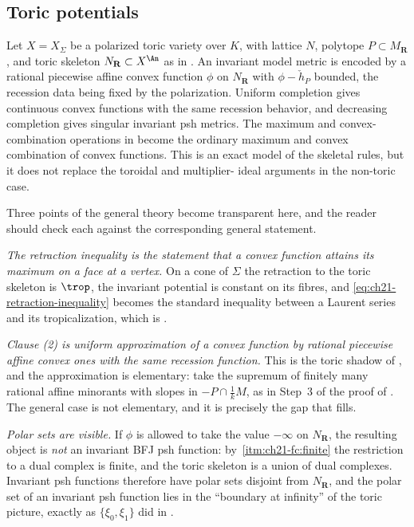 \subsection{Toric potentials}
\label{sec:ch21-worked-toric}

\begin{example}
\label{ex:ch21-toric}
Let \(X=X_\Sigma\) be a polarized toric variety over \(K\), with lattice
\(N\), polytope \(P\subset M_{\mathbf R}\), and toric skeleton
\(N_{\mathbf R}\subset X^{\An}\) as in .  An
invariant model metric is
encoded by a rational piecewise affine convex function \(\phi\) on
\(N_{\mathbf R}\) with \(\phi-\check h_P\) bounded, the recession data being
fixed by the polarization.  Uniform completion gives continuous convex
functions with the same recession behavior, and decreasing completion gives
singular invariant psh metrics.  The maximum and convex-combination
operations in  become the ordinary
maximum and convex combination of convex functions.  This is an exact model
of the skeletal rules, but it does not replace the toroidal and multiplier-%
ideal arguments in the non-toric case.

Three points of the general theory become transparent here, and the reader
should check each against the corresponding general statement.

\emph{The retraction inequality is the statement that a convex function
attains its maximum on a face at a vertex.}  On a cone of \(\Sigma\) the
retraction to the toric skeleton is \(\trop\), the invariant potential is
constant on its fibres, and \eqref{eq:ch21-retraction-inequality} becomes
the standard inequality between a Laurent series and its tropicalization,
which is .

\emph{Clause \textup{(2)} is uniform approximation of a convex function by
rational piecewise affine convex ones with the same recession function.}
This is the toric shadow of , and the approximation
is elementary: take the supremum of finitely many rational affine minorants
with slopes in \(-P\cap\tfrac1kM\), as in Step~3 of the proof of
.  The general case is not elementary, and it is
precisely the gap that  fills.

\emph{Polar sets are visible.}  If \(\phi\) is allowed to take the value
\(-\infty\) on \(N_{\mathbf R}\), the resulting object is \emph{not} an
invariant BFJ psh function: by
\,\cref{itm:ch21-fc:finite} the
restriction to a dual complex is finite, and the toric skeleton is a union
of dual complexes.  Invariant psh functions therefore have polar sets
disjoint from \(N_{\mathbf R}\), and the polar set of an invariant psh
function lies in the ``boundary at infinity'' of the toric picture, exactly
as \(\{\xi_0,\xi_1\}\) did in .


\end{example}
